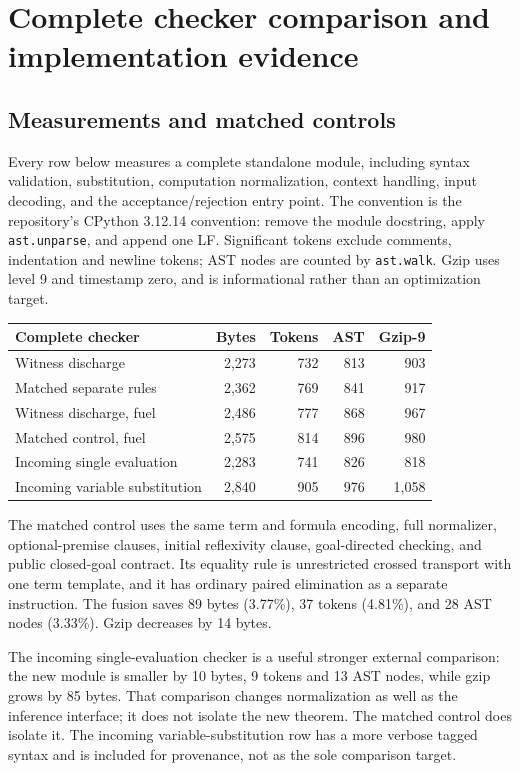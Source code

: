 \documentclass[11pt,letterpaper]{article}
\theoremstyle{definition}\newtheorem{definition}[theorem]{Definition}
\theoremstyle{remark}\newtheorem{remark}[theorem]{Remark}
\begin{document}
\section{Complete checker comparison and implementation evidence}
\label{sec:implementation}

\subsection{Measurements and matched controls}

Every row below measures a complete standalone module, including syntax
validation, substitution, computation normalization, context handling, input
decoding, and the acceptance/rejection entry point. The convention is the
repository's CPython 3.12.14 convention: remove the module docstring, apply
\texttt{ast.unparse}, and append one LF. Significant tokens exclude comments,
indentation and newline tokens; AST nodes are counted by \texttt{ast.walk}.
Gzip uses level 9 and timestamp zero, and is informational rather than an
optimization target.

\begin{center}\small
\begin{tabular}{lrrrr}
\toprule
Complete checker & Bytes & Tokens & AST & Gzip-9\\
\midrule
Witness discharge & 2,273 & 732 & 813 & 903 \\
Matched separate rules & 2,362 & 769 & 841 & 917 \\
Witness discharge, fuel & 2,486 & 777 & 868 & 967 \\
Matched control, fuel & 2,575 & 814 & 896 & 980 \\
Incoming single evaluation & 2,283 & 741 & 826 & 818 \\
Incoming variable substitution & 2,840 & 905 & 976 & 1,058 \\
\bottomrule
\end{tabular}
\end{center}

The matched control uses the same term and formula encoding, full normalizer,
optional-premise clauses, initial reflexivity clause, goal-directed checking,
and public closed-goal contract. Its equality rule is unrestricted crossed
transport with one term template, and it has ordinary paired elimination as
a separate instruction. The fusion saves 89 bytes (3.77\%), 37 tokens
(4.81\%), and 28 AST nodes (3.33\%). Gzip decreases by 14 bytes.

The incoming single-evaluation checker is a useful stronger external
comparison: the new module is smaller by 10 bytes, 9 tokens and 13 AST nodes,
while gzip grows by 85 bytes. That comparison changes normalization as well
as the inference interface; it does not isolate the new theorem. The matched
control does isolate it. The incoming variable-substitution row has a more
verbose tagged syntax and is included for provenance, not as the sole
comparison target.
\end{document}
